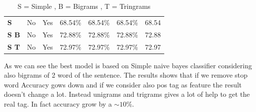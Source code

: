 \documentclass[a4paper,8pt,oneside]{article}
\begin{document}
\begin{table}[h]
\begin{tabular}{lcccccc}
			\textbf{S}               & No                 & Yes              & 68.54\%           & 68.54\%            & 68.54\%         & 68.54             \\
			\textbf{S B}  & No                 & Yes              & 72.88\%           & 72.88\%            & 72.88\%         & 72.88             \\
			\textbf{S T} & No                 & Yes              & 72.97\%           & 72.97\%            & 72.97\%         & 72.97            
			\end{tabular}
			\caption{ S = Simple , B = Bigrams , T = Tringrams }
			\label{bayes}
			\end{table}
			As we can see the best model is based on Simple naive bayes classifier considering also bigrams of 2 word of the sentence. The results shows that if we remove stop word Accuracy gows down and if we consider also pos tag as feature the result doesn't change a lot. Instead unigrams and trigrams gives a lot of help to get the real tag. In fact accuracy grow by a $\sim 10\% $.
\end{document}
